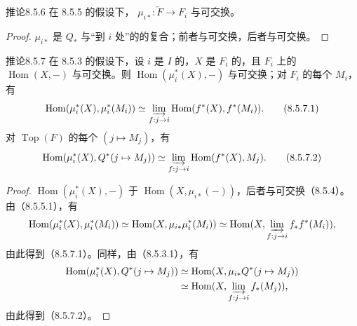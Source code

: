 \begin{SGAresult}{推论}{8.5.6}
在 8.5.5 的假设下， $\mu_{i*}:\underleftarrow F\to F_i$ 与可交换。
\end{SGAresult}
\begin{proof}
$\mu_{i*}$ 是 $Q_*$ 与“到 $i$ 处”的的复合；前者与可交换，后者与可交换。
\end{proof}

\begin{SGAresult}{推论}{8.5.7}
在 8.5.3 的假设下，设 $i$ 是 $I$ 的，$X$ 是 $F_i$ 的，且 $F_i$ 上的 $\operatorname{Hom}(X,-)$ 与可交换。则 $\operatorname{Hom}(\mu_i^*(X),-)$ 与可交换；对 $F_i$ 的每个 $M_i$，有
\[
 \operatorname{Hom}(\mu_i^*(X),\mu_i^*(M_i))\simeq
 \varinjlim_{f:j\to i}\operatorname{Hom}(f^*(X),f^*(M_i)).\tag{8.5.7.1}
\]
对 $\operatorname{Top}(F)$ 的每个 $(j\mapsto M_j)$，有
\[
 \operatorname{Hom}(\mu_i^*(X),Q^*(j\mapsto M_j))\simeq
 \varinjlim_{f:j\to i}\operatorname{Hom}(f^*(X),M_j).\tag{8.5.7.2}
\]
\end{SGAresult}
\begin{proof}
 $\operatorname{Hom}(\mu_i^*(X),-)$ 于 $\operatorname{Hom}(X,\mu_{i*}(-))$，后者与可交换（8.5.4）。由（8.5.5.1），有
\[
 \operatorname{Hom}(\mu_i^*(X),\mu_i^*(M_i))
 \simeq\operatorname{Hom}(X,\mu_{i*}\mu_i^*(M_i))
 \simeq\operatorname{Hom}(X,\varinjlim_{f:j\to i}f_*f^*(M_i)),
\]
由此得到（8.5.7.1）。同样，由（8.5.3.1），有
\[
\begin{split}
 \operatorname{Hom}(\mu_i^*(X),Q^*(j\mapsto M_j))
 &\simeq\operatorname{Hom}(X,\mu_{i*}Q^*(j\mapsto M_j))\\
 &\simeq\operatorname{Hom}(X,\varinjlim_{f:j\to i}f_*(M_j)),
\end{split}
\]
由此得到（8.5.7.2）。
\end{proof}

